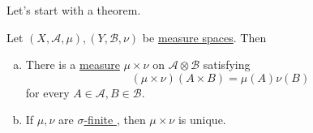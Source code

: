 Let's start with a theorem.
\begin{theorem}
	Let \((X, \mathcal{A} , \mu ), (Y, \mathcal{B} , \nu )\) be \hyperref[def:measure-space]{measure spaces}. Then
	\begin{enumerate}[(a)]
		\item There is a \hyperref[def:measure]{measure} \(\mu \times \nu \) on \(\mathcal{A} \otimes \mathcal{B} \) satisfying
		      \[
			      (\mu \times \nu )(A\times B) = \mu (A)\nu (B)
		      \]
		      for every \(A\in \mathcal{A} , B\in \mathcal{B} \).
		\item If \(\mu , \nu \) are \hyperref[def:sigma-finite-measure]{\(\sigma\)-finite }, then \(\mu \times \nu \) is unique.
	\end{enumerate}
\end{theorem}
